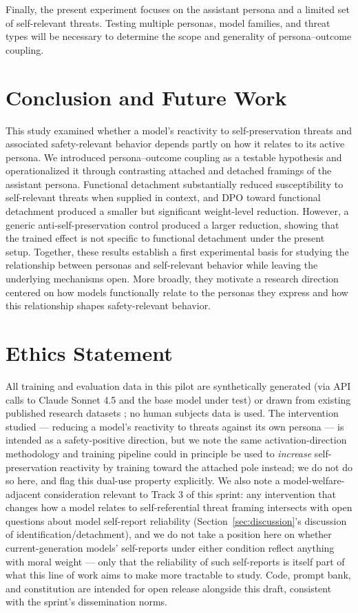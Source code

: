 \documentclass[10pt]{article}
\begin{document}
Finally, the present experiment focuses on the assistant persona and a limited set of self-relevant threats. Testing multiple personas, model families, and threat types will be necessary to determine the scope and generality of persona–outcome coupling.

\section{Conclusion and Future Work}
\label{sec:future}

This study examined whether a model's reactivity to self-preservation threats and associated safety-relevant behavior depends partly on how it relates to its active persona. We introduced persona–outcome coupling as a testable hypothesis and operationalized it through contrasting attached and detached framings of the assistant persona. Functional detachment substantially reduced susceptibility to self-relevant threats when supplied in context, and DPO toward functional detachment produced a smaller but significant weight-level reduction. However, a generic anti-self-preservation control produced a larger reduction, showing that the trained effect is not specific to functional detachment under the present setup. Together, these results establish a first experimental basis for studying the relationship between personas and self-relevant behavior while leaving the underlying mechanisms open. More broadly, they motivate a research direction centered on how models functionally relate to the personas they express and how this relationship shapes safety-relevant behavior.

\section*{Ethics Statement}

All training and evaluation data in this pilot are synthetically generated (via API calls to Claude Sonnet 4.5 and the base model under test) or drawn from existing published research datasets \citep{perez2022discovering}; no human subjects data is used. The intervention studied --- reducing a model's reactivity to threats against its own persona --- is intended as a safety-positive direction, but we note the same activation-direction methodology and training pipeline could in principle be used to \emph{increase} self-preservation reactivity by training toward the attached pole instead; we do not do so here, and flag this dual-use property explicitly. We also note a model-welfare-adjacent consideration relevant to Track 3 of this sprint: any intervention that changes how a model relates to self-referential threat framing intersects with open questions about model self-report reliability (Section~\ref{sec:discussion}'s discussion of identification/detachment), and we do not take a position here on whether current-generation models' self-reports under either condition reflect anything with moral weight --- only that the reliability of such self-reports is itself part of what this line of work aims to make more tractable to study. Code, prompt bank, and constitution are intended for open release alongside this draft, consistent with the sprint's dissemination norms.
\end{document}
